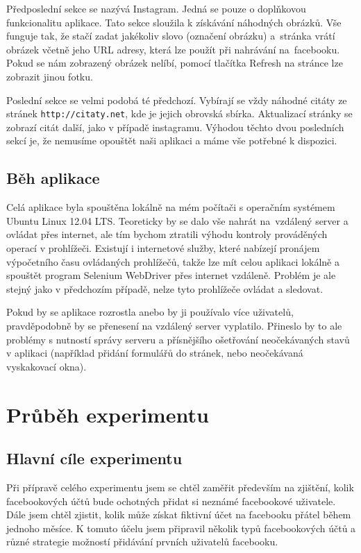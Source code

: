 \documentclass[thesis=M,czech]{FITthesis}[2013/05/10]
\begin{document}
Předposlední sekce se nazývá Instagram. Jedná se pouze o doplňkovou funkcionalitu aplikace. Tato sekce sloužila k získávání náhodných obrázků. Vše funguje tak, že stačí zadat jakékoliv slovo (označení obrázku) a~stránka vrátí obrázek včetně jeho URL adresy, která lze použít při nahrávání na~facebooku. Pokud se nám zobrazený obrázek nelíbí, pomocí tlačítka Refresh na stránce lze zobrazit jinou fotku.

Poslední sekce se velmi podobá té předchozí. Vybírají se vždy náhodné citáty ze stránek \verb|http://citaty.net|, kde je jejich obrovská sbírka. Aktualizací stránky se zobrazí citát další, jako v případě instagramu. Výhodou těchto dvou posledních sekcí je, že nemusíme opouštět naši aplikaci a máme vše potřebné k dispozici.



\section{Běh aplikace}

Celá aplikace byla spouštěna lokálně na mém počítači s operačním systémem Ubuntu Linux 12.04 LTS. Teoreticky by se dalo vše nahrát na~vzdálený server a ovládat přes internet, ale tím bychom ztratili výhodu kontroly prováděných operací v prohlížeči. Existují i internetové služby, které nabízejí pronájem výpočetního času ovládaných prohlížečů, takže lze mít celou aplikaci lokálně a spouštět program Selenium WebDriver přes internet vzdáleně. Problém je ale stejný jako v předchozím případě, nelze tyto prohlížeče ovládat a sledovat.

Pokud by se aplikace rozrostla anebo by ji používalo více uživatelů, pravděpodobně by se přenesení na vzdálený server vyplatilo. Přineslo by to ale problémy s nutností správy serveru a přísnějšího ošetřování neočekávaných stavů v aplikaci (například přidání formulářů do stránek, nebo neočekávaná vyskakovací okna).





\chapter{Průběh experimentu}

\section{Hlavní cíle experimentu}

Při přípravě celého experimentu jsem se chtěl zaměřit především na zjištění, kolik facebookových účtů bude ochotných přidat si neznámé facebookové uživatele. Dále jsem chtěl zjistit, kolik může získat fiktivní účet na facebooku přátel během jednoho měsíce. K tomuto účelu jsem připravil několik typů facebookových účtů a různé strategie možností přidávání prvních uživatelů facebooku.
\end{document}
